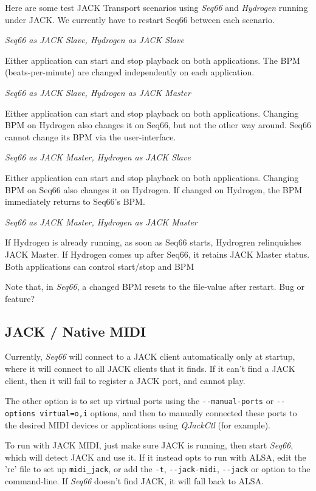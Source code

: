    Here are some test JACK Transport scenarios using
   \textsl{Seq66} and \textsl{Hydrogen} running under JACK.
   We currently have to restart Seq66 between each scenario.

   \textsl{Seq66 as JACK Slave, Hydrogen as JACK Slave}

      Either application can start and stop playback on both applications.
      The BPM (beats-per-minute) are changed independently on each application.

   \textsl{Seq66 as JACK Slave, Hydrogen as JACK Master}

      Either application can start and stop playback on both applications.
      Changing BPM on Hydrogen also changes it on Seq66, but not the other way
      around. Seq66 cannot change its BPM via the user-interface.

   \textsl{Seq66 as JACK Master, Hydrogen as JACK Slave}

      Either application can start and stop playback on both applications.
      Changing BPM on Seq66 also changes it on Hydrogen.  If changed on Hydrogen,
      the BPM immediately returns to Seq66's BPM.

   \textsl{Seq66 as JACK Master, Hydrogen as JACK Master}

      If Hydrogen is already running, as soon as Seq66 starts, Hydrogren
      relinquishes JACK Master.
      If Hydrogen comes up after Seq66, it retains JACK Master status.  Both
      applications can control start/stop and BPM

   Note that, in \textsl{Seq66}, a changed BPM resets to the file-value after
   restart.  Bug or feature?

\subsection{JACK / Native MIDI}
\label{subsec:jack_native_midi}

   Currently, \textsl{Seq66} will connect to a JACK
   client automatically only at startup, where it will connect to all JACK
   clients that it finds.  If it can't find a JACK client, then it will
   fail to register a JACK port, and cannot play.

   The other option is to set up virtual ports using the
   \texttt{-{}-manual-ports} or \texttt{-{}-options virtual=o,i} options, and then
   to manually connected these ports to the desired MIDI devices or
   applications using \textsl{QJackCtl} (for example).

   To run with JACK MIDI, just make sure JACK is running, then start
   \textsl{Seq66}, which will detect JACK and use it.
   If it instead opts to run with ALSA, edit the 'rc' file to set up
   \texttt{midi\_jack}, or add the
   \texttt{-t}, \texttt{-{}-jack-midi},
   \texttt{-{}-jack}
   or option to the command-line.
   If \textsl{Seq66} doesn't find JACK, it will fall back to ALSA.

